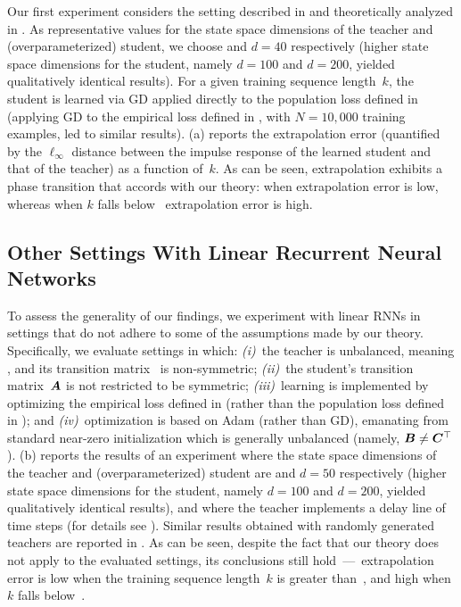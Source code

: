 Our first experiment considers the setting described in  and theoretically analyzed in .
As representative values for the state space dimensions of the teacher and (overparameterized) student, we choose  and $d = 40$ respectively (higher state space dimensions for the student, namely $d = 100$ and $d = 200$, yielded qualitatively identical results).
For a given training sequence length~$k$, the student is learned via GD applied directly to the population loss defined in  (applying GD to the empirical loss defined in , with $N = 10,000$ training examples, led to similar results). %
(a) reports the extrapolation error (quantified by the $\ell_\infty$ distance between the impulse response of the learned student and that of the teacher) as a function of~$k$.
As can be seen, extrapolation exhibits a phase transition that accords with our theory: when  extrapolation error is low, whereas when $k$ falls below~ extrapolation error is high.

\subsection{Other Settings With Linear Recurrent Neural Networks} \label{sec:exp:step_func}

To assess the generality of our findings, we experiment with linear RNNs in settings that do not adhere to some of the assumptions made by our theory.
Specifically, we evaluate settings in which:
\emph{(i)}~the teacher is unbalanced, meaning \smash{$\hat{\mB} \neq \hat{\mC}^\top$}, and its transition matrix~\smash{$\hat{\mA}$} is non-symmetric;
\emph{(ii)}~the student's transition matrix~${\bm{A}}$ is not restricted to be symmetric;
\emph{(iii)}~learning is implemented by optimizing the empirical loss defined in  (rather than the population loss defined in );
and
\emph{(iv)}~optimization is based on Adam \cite{kingma2014adam} (rather than GD), emanating from standard near-zero initialization which is generally unbalanced (namely, ${\bm{B}}\neq {\bm{C}}^\top$).
(b) reports the results of an experiment where the state space dimensions of the teacher and (overparameterized) student are  and $d = 50$ respectively (higher state space dimensions for the student, namely $d = 100$ and $d = 200$, yielded qualitatively identical results), and where the teacher implements a delay line of  time steps (for details see ).
Similar results obtained with randomly generated teachers are reported in .
As can be seen, despite the fact that our theory does not apply to the evaluated settings, its conclusions still hold~---~extrapolation error is low when the training sequence length~$k$ is greater than~, and high when $k$ falls below~.

